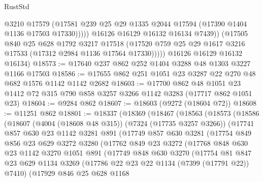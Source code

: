 \begin{lexlean}{RustStd}
\begin{coremodule}
                    @3210
                    @17579
                    (@17581 @239 @25 @29 @1335 @2044 @17594 (@17390 @1404 @1136 @17503 @17330)))))
              @16126
              @16129
              @16132
              @16134
              @7439))
          (@17505
            @840
            @25
            @628
            @1792
            @3217
            @17518
            (@17520 @759 @25 @29 @1617 @3216 @17533 (@17312 @2984 @1136 @17564 @17330)))))
      @16126
      @16129
      @16132
      @16134)
@18573 := @17640 @237 @862 @252 @1404 @3288 @48 @1303 @3227 @1166 @17503
@18586 := @17655 @862 @251 @1051 @23 @3287 @22 @270 @48 @682 @1576 @1142 @1142 @2682
@18603 := @17700
    @862
    @48
    @1051
    @23
    @1412
    @72
    @315
    @790
    @858
    @3257
    @3266
    @1142
    @3283
    (@17717 @862 @1051 @23)
@18604 := @9284 @862
@18607 := @18603 (@9272 (@18604 @72))
@18608 := @11251 @862
@18801 := @18337
    (@18369
      (@18467
        (@18563
          (@18573
            (@18586
              (@18607
                (@4004 (@18608 @48 @315))
                (@7324 (@17735 @3257 @3266))
                (@17741
                  @857
                  @630
                  @23
                  @1142
                  @3281
                  @891
                  (@17749
                    @857
                    @630
                    @3281
                    (@17754
                      @849
                      @856
                      @23
                      @629
                      @3272
                      @3280
                      (@17762
                        @849
                        @23
                        @3272
                        (@17768
                          @848
                          @630
                          @23
                          @1142
                          @3270
                          @1051
                          @891
                          (@17749
                            @848
                            @630
                            @3270
                            (@17754
                              @81
                              @847
                              @23
                              @629
                              @1134
                              @3269
                              (@17786 @22 @23 @22 @1134 (@7399 (@17791 @22)) @7410)
                              (@17929
                                @846
                                @25
                                @628
                                @1168

\end{coremodule}
\end{lexlean}
